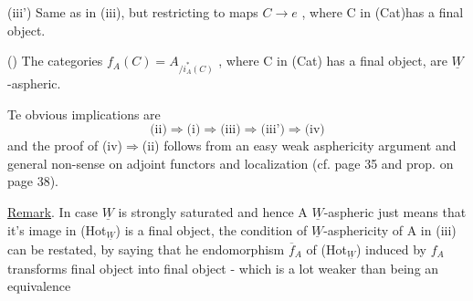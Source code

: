 (iii')  Same as in (iii),  but restricting to maps $C \to e$ , where C
in (Cat)has a final object.

()  The categories   $f_A(C) = A_{/i_A^*(C)}$ ,  where C in (Cat)
has a final object,  are $\underline{W}$-aspheric.

Te obvious implications are
\[ \text{(ii)}\Longrightarrow\text{(i)}\Rightarrow\text{(iii)}\Longrightarrow\text{(iii')}\Longrightarrow\text{(iv)} \]
and the proof of (iv)$\Longrightarrow$(ii) follows from an easy weak asphericity
argument and general non-sense on adjoint functors and localization
(cf. page 35 and prop. on page 38).

\uline{Remark}.  In case $\underline{W}$  is strongly saturated\hand{,} and hence  A $\underline{W}$-aspheric
just means that it's image in (Hot$_{\underline{W}}$)  is a final object,  the condition
of $\underline{W}$-asphericity of A in (iii) can be restated,  by saying that he
endomorphism $\overline{f}_A$ of (Hot$_{\underline{W}}$) induced by $f_A$ transforms final object into
final object\hand{,}  -  which is a lot weaker than  being an equivalence \hand{!}

